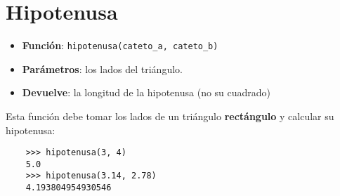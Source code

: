 \documentclass{article}
\begin{document}
\section{Hipotenusa}
\begin{itemize}
    \item \textbf{Función}: \verb|hipotenusa(cateto_a, cateto_b)|
    \item \textbf{Parámetros}: los lados del triángulo.
    \item \textbf{Devuelve}: la longitud de la hipotenusa (no su cuadrado)
\end{itemize}
Esta función debe tomar los lados de un triángulo \textbf{rectángulo} y calcular su hipotenusa:
\begin{verbatim}
    >>> hipotenusa(3, 4)
    5.0
    >>> hipotenusa(3.14, 2.78)
    4.193804954930546
\end{verbatim}
\end{document}
